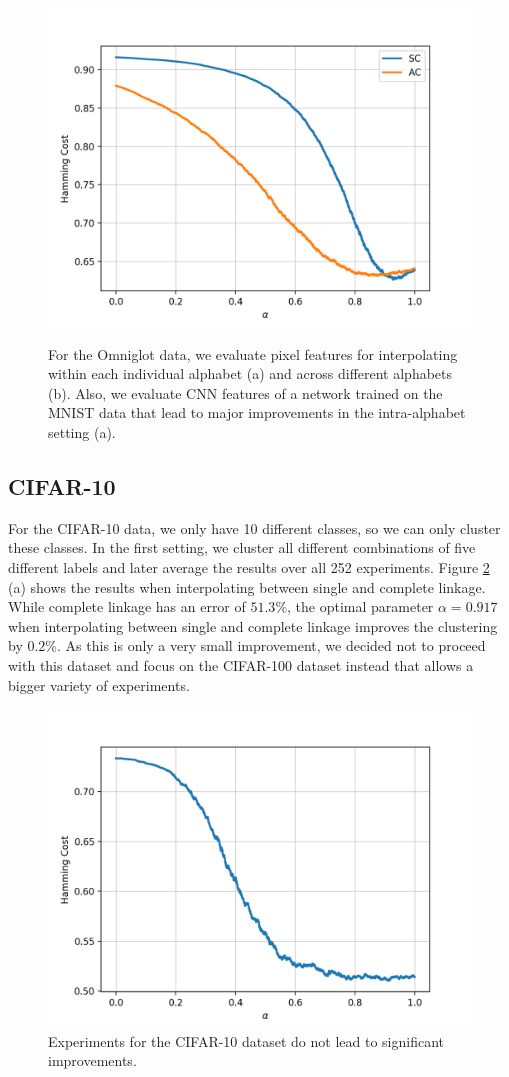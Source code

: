 \begin{figure}[H]
\begin{minipage}{.45\textwidth}
  {\includegraphics[width=\linewidth]{plots/omniglot_inter}}
\end{minipage}
\caption{For the Omniglot data, we evaluate pixel features for interpolating within each individual alphabet (a) and across different alphabets (b). Also, we evaluate CNN features of a network trained on the MNIST data that lead to major improvements in the intra-alphabet setting (a).}
\label{fig:omniglot_overview}
\end{figure}

\subsection{CIFAR-10}

For the CIFAR-10 data, we only have 10 different classes, so we can only cluster these classes. In the first setting, we cluster all different combinations of five different labels and later average the results over all 252 experiments. Figure \ref{fig:cifar10res} (a) shows the results when interpolating between single and complete linkage. While complete linkage has an error of $51.3\%$, the optimal parameter $\alpha = 0.917$ when interpolating between single and complete linkage improves the clustering by $0.2\%$. As this is only a very small improvement, we decided not to proceed with this dataset and focus on the CIFAR-100 dataset instead that allows a bigger variety of experiments.

\begin{figure}[H]
  \centering
  \includegraphics[width=.6\textwidth]{plots/cifar10_sc}
  \caption{Experiments for the CIFAR-10 dataset do not lead to significant improvements.}
  \label{fig:cifar10res}
\end{figure}

